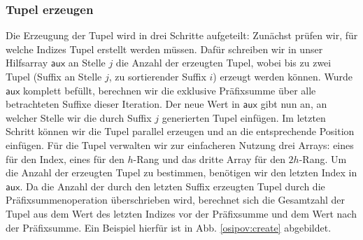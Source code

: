 \subsubsection{Tupel erzeugen}
Die Erzeugung der Tupel wird in drei Schritte aufgeteilt: Zunächst prüfen wir, für welche Indizes Tupel erstellt werden müssen. Dafür schreiben wir in unser Hilfsarray $\mathsf{aux}$ an Stelle $j$ die Anzahl der erzeugten Tupel, wobei bis zu zwei Tupel (Suffix an Stelle $j$, zu sortierender Suffix $i$) erzeugt werden können. Wurde $\mathsf{aux}$ komplett befüllt, berechnen wir die exklusive Präfixsumme über alle betrachteten Suffixe dieser Iteration. Der neue Wert in $\mathsf{aux}$ gibt nun an, an welcher Stelle wir die durch Suffix $j$ generierten Tupel einfügen. Im letzten Schritt können wir die Tupel parallel erzeugen und an die entsprechende Position einfügen. 
Für die Tupel verwalten wir zur einfacheren Nutzung drei Arrays: eines für den Index, eines für den $h$-Rang und das dritte Array für den $2h$-Rang. Um die Anzahl der erzeugten Tupel zu bestimmen, benötigen wir den letzten Index in $\mathsf{aux}$. Da die Anzahl der durch den letzten Suffix erzeugten Tupel durch die Präfixsummenoperation überschrieben wird, berechnet sich die Gesamtzahl der Tupel aus dem Wert des letzten Indizes vor der Präfixsumme und dem Wert nach der Präfixsumme. Ein Beispiel hierfür ist in Abb. \ref{osipov:create} abgebildet.

